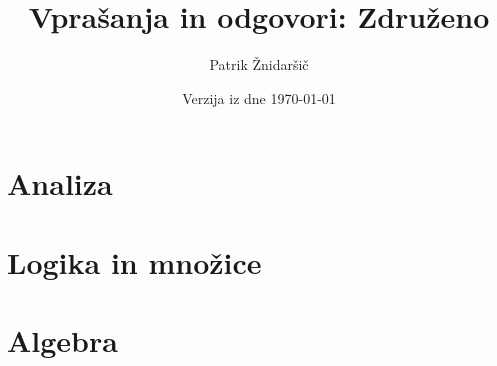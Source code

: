 \documentclass[11pt]{report}
\title{Vprašanja in odgovori: Združeno}
\author{Patrik Žnidaršič}
\date{Verzija iz dne \today}
\begin{document}
\maketitle
\tableofcontents

\chapter{Analiza}


\chapter{Logika in množice}


\chapter{Algebra}

	
\end{document}
